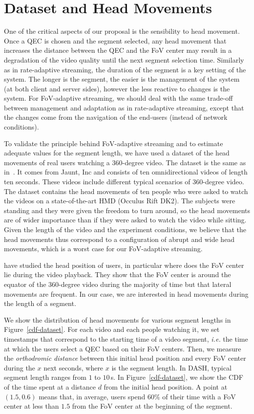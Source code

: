 \section{Dataset and Head Movements}

One of the critical aspects of our proposal is the sensibility to head movement. Once a QEC is chosen and the 
segment selected, any head movement that increases the distance between the QEC and the FoV center 
may result in a degradation of the video quality until the next segment selection time. 
Similarly as in rate-adaptive
streaming, the duration of the segment is a key setting of the system. The longer is the segment, the easier is
the management of the system (at both client and server sides), however the less reactive to changes is the system.
For FoV-adaptive streaming, we should deal with the same trade-off between management and adaptation 
as in rate-adaptive streaming,
except that the changes come from 
the navigation of the end-users (instead of network conditions).

To validate the principle behind FoV-adaptive streaming and to estimate adequate values for
the segment length, we have used a dataset of the head movements of real users watching
a 360-degree video. The dataset is the same as in~\cite{yu_framework_2015}. It comes from
Jaunt, Inc and consists of ten omnidirectional videos of length ten seconds. These videos include
different typical scenarios of 360-degree video. The dataset contains the head movements of
ten people who were asked to watch the videos on a state-of-the-art \ac{HMD} (Occulus Rift DK2).
The subjects were standing and they were given the freedom to turn around, so the head movements
are of wider importance than if they were asked to watch the video while sitting. Given the length of
the video and the experiment conditions, we believe that the head movements thus correspond to 
a configuration of abrupt and wide head movements, which is a worst case for our FoV-adaptive streaming.

\citet{yu_framework_2015} have studied the head position of users, in particular where does the FoV center lie 
during the video playback. They show that the FoV center is around the equator of the 360-degree video
during the majority of time but that lateral movements are frequent. In our case, we are interested in head
movements during the length of a segment.

We show the distribution of head movements for various segment lengths in Figure~\ref{cdf-dataset}. 
For each video
and each people watching it, we set timestamps that correspond to the starting time of a video segment,
\textit{i.e.} the time at which the users select a QEC based on their FoV centers.
Then, we measure the \emph{orthodromic distance} between this initial head position and every FoV center
during the $x$ next seconds, where $x$ is the segment length. In \ac{DASH}, typical segment length ranges
from $1$ to $10$\,s. In Figure~\ref{cdf-dataset}, we show the \ac{CDF} of the time spent at a distance
$d$ from the initial head position. A point at $(1.5,0.6)$ means that, in average, users spend $60\%$ of
their time with a FoV center at less than $1.5$ from the FoV center at the beginning of the segment.

